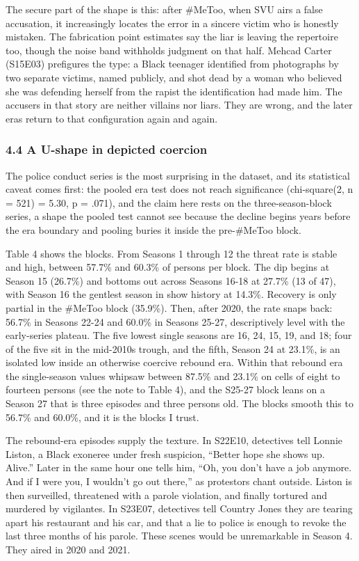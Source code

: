 \documentclass[
]{article}
\begin{document}
The secure part of the shape is this: after \#MeToo, when SVU airs a
false accusation, it increasingly locates the error in a sincere victim
who is honestly mistaken. The fabrication point estimates say the liar
is leaving the repertoire too, though the noise band withholds judgment
on that half. Mehcad Carter (S15E03) prefigures the type: a Black
teenager identified from photographs by two separate victims, named
publicly, and shot dead by a woman who believed she was defending
herself from the rapist the identification had made him. The accusers in
that story are neither villains nor liars. They are wrong, and the later
eras return to that configuration again and again.

\subsubsection{4.4 A U-shape in depicted
coercion}\label{a-u-shape-in-depicted-coercion}

The police conduct series is the most surprising in the dataset, and its
statistical caveat comes first: the pooled era test does not reach
significance (chi-square(2, n = 521) = 5.30, p = .071), and the claim
here rests on the three-season-block series, a shape the pooled test
cannot see because the decline begins years before the era boundary and
pooling buries it inside the pre-\#MeToo block.

Table 4 shows the blocks. From Seasons 1 through 12 the threat rate is
stable and high, between 57.7\% and 60.3\% of persons per block. The dip
begins at Season 15 (26.7\%) and bottoms out across Seasons 16-18 at
27.7\% (13 of 47), with Season 16 the gentlest season in show history at
14.3\%. Recovery is only partial in the \#MeToo block (35.9\%). Then,
after 2020, the rate snaps back: 56.7\% in Seasons 22-24 and 60.0\% in
Seasons 25-27, descriptively level with the early-series plateau. The
five lowest single seasons are 16, 24, 15, 19, and 18; four of the five
sit in the mid-2010s trough, and the fifth, Season 24 at 23.1\%, is an
isolated low inside an otherwise coercive rebound era. Within that
rebound era the single-season values whipsaw between 87.5\% and 23.1\%
on cells of eight to fourteen persons (see the note to Table 4), and the
S25-27 block leans on a Season 27 that is three episodes and three
persons old. The blocks smooth this to 56.7\% and 60.0\%, and it is the
blocks I trust.

The rebound-era episodes supply the texture. In S22E10, detectives tell
Lonnie Liston, a Black exoneree under fresh suspicion, ``Better hope she
shows up. Alive.'' Later in the same hour one tells him, ``Oh, you don't
have a job anymore. And if I were you, I wouldn't go out there,'' as
protestors chant outside. Liston is then surveilled, threatened with a
parole violation, and finally tortured and murdered by vigilantes. In
S23E07, detectives tell Country Jones they are tearing apart his
restaurant and his car, and that a lie to police is enough to revoke the
last three months of his parole. These scenes would be unremarkable in
Season 4. They aired in 2020 and 2021.
\end{document}

